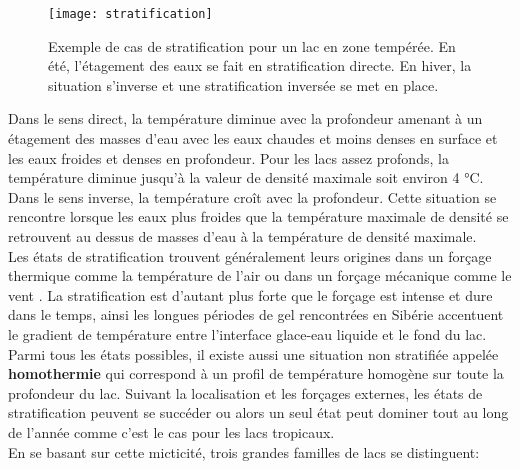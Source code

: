 \begin{figure}[h!]
 \centerline{\texttt{[image: stratification]}}
 \caption{Exemple de cas de stratification pour un lac en zone tempérée. En été, l'étagement des eaux se fait en stratification directe. En hiver, la situation s'inverse et une stratification inversée se met en place.}
 \label{stratification}
\end{figure}

Dans le sens direct, la température diminue avec la profondeur amenant à un étagement des masses d'eau avec les eaux chaudes et moins denses en surface et les eaux froides et denses en profondeur. Pour les lacs assez profonds, la température diminue jusqu'à la valeur de densité maximale soit environ 4 °C. Dans le sens inverse, la température croît avec la profondeur. Cette situation se rencontre lorsque les eaux plus froides que la température maximale de densité se retrouvent au dessus de masses d'eau à la température de densité maximale.\\ 
Les états de stratification trouvent généralement leurs origines dans un forçage thermique comme la température de l'air ou dans un forçage mécanique comme le vent \citep{snortheim2017}. La stratification est d'autant plus forte que le forçage est intense et dure dans le temps, ainsi les longues périodes de gel rencontrées en Sibérie accentuent le gradient de température entre l'interface glace-eau liquide et le fond du lac. Parmi tous les états possibles, il existe aussi une situation non stratifiée appelée \textbf{homothermie} qui correspond à un profil de température homogène sur toute la profondeur du lac. Suivant la localisation et les forçages externes, les états de stratification peuvent se succéder ou alors un seul état peut dominer tout au long de l'année comme c'est le cas pour les lacs tropicaux.\\
En se basant sur cette micticité, trois grandes familles de lacs se distinguent:\\


